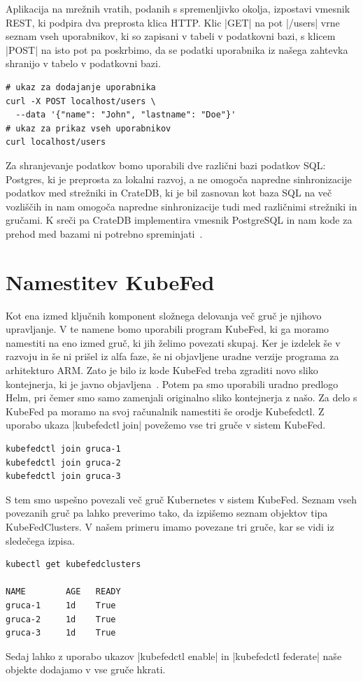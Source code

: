 \documentclass[a4paper, 12pt]{book}
\begin{document}
Aplikacija na mrežnih vratih, podanih s spremenljivko okolja, izpostavi vmesnik REST, ki podpira dva preprosta klica HTTP.
Klic \spverb|GET| na pot \spverb|/users| vrne seznam vseh uporabnikov, ki so zapisani v tabeli v podatkovni bazi, s klicem \spverb|POST| na isto pot pa poskrbimo, da se podatki uporabnika iz našega zahtevka shranijo v tabelo v podatkovni bazi.
\begin{verbatim}
# ukaz za dodajanje uporabnika
curl -X POST localhost/users \
  --data '{"name": "John", "lastname": "Doe"}'
# ukaz za prikaz vseh uporabnikov
curl localhost/users
\end{verbatim}

Za shranjevanje podatkov bomo uporabili dve različni bazi podatkov SQL: Postgres, ki je preprosta za lokalni razvoj, a ne omogoča napredne sinhronizacije podatkov med strežniki in CrateDB, ki je bil zasnovan kot baza SQL na več vozliščih in nam omogoča napredne sinhronizacije tudi med različnimi strežniki in gručami.
K sreči pa CrateDB implementira vmesnik PostgreSQL in nam kode za prehod med bazami ni potrebno spreminjati~\cite{cratedb}.
\section{Namestitev KubeFed}
Kot ena izmed ključnih komponent složnega delovanja več gruč je njihovo upravljanje.
V te namene bomo uporabili program KubeFed, ki ga moramo namestiti na eno izmed gruč, ki jih želimo povezati skupaj.
Ker je izdelek še v razvoju in še ni prišel iz alfa faze, še ni objavljene uradne verzije programa za arhitekturo ARM.
Zato je bilo iz kode KubeFed treba zgraditi novo sliko kontejnerja, ki je javno objavljena~\cite{docker-kubefed}.
Potem pa smo uporabili uradno predlogo Helm, pri čemer smo samo zamenjali originalno sliko kontejnerja z našo.
Za delo s KubeFed pa moramo na svoj računalnik namestiti še orodje Kubefedctl.
Z uporabo ukaza \spverb|kubefedctl join| povežemo vse tri gruče v sistem KubeFed.
\begin{verbatim}
kubefedctl join gruca-1
kubefedctl join gruca-2
kubefedctl join gruca-3
\end{verbatim}
S tem smo uspešno povezali več gruč Kubernetes v sistem KubeFed.
Seznam vseh povezanih gruč pa lahko preverimo tako, da izpišemo seznam objektov tipa KubeFedClusters. 
V našem primeru imamo povezane tri gruče, kar se vidi iz sledečega izpisa.
\begin{verbatim}
kubectl get kubefedclusters

NAME        AGE   READY
gruca-1     1d    True
gruca-2     1d    True
gruca-3     1d    True
\end{verbatim}
Sedaj lahko z uporabo ukazov \spverb|kubefedctl enable| in \spverb|kubefedctl federate| naše objekte dodajamo v vse gruče hkrati.
\end{document}
